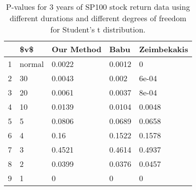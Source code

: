 \begin{table}[ht]
\centering
\caption{P-values for 3 years of SP100 stock return 
                   data using different durations
  and different degrees of freedom for Student's t distribution.} 
\label{table:SP1003}
\begin{tabular}{rllll}
  \hline
 & \$v\$ & Our Method & Babu & Zeimbekakis \\ 
  \hline
1 & normal & 0.0022 & 0.0012 & 0 \\ 
  2 & 30 & 0.0043 & 0.002 & 6e-04 \\ 
  3 & 20 & 0.0061 & 0.0037 & 8e-04 \\ 
  4 & 10 & 0.0139 & 0.0104 & 0.0048 \\ 
  5 & 5 & 0.0806 & 0.0689 & 0.0658 \\ 
  6 & 4 & 0.16 & 0.1522 & 0.1578 \\ 
  7 & 3 & 0.4521 & 0.4614 & 0.4937 \\ 
  8 & 2 & 0.0399 & 0.0376 & 0.0457 \\ 
  9 & 1 & 0 & 0 & 0 \\ 
   \hline
\end{tabular}
\end{table}

